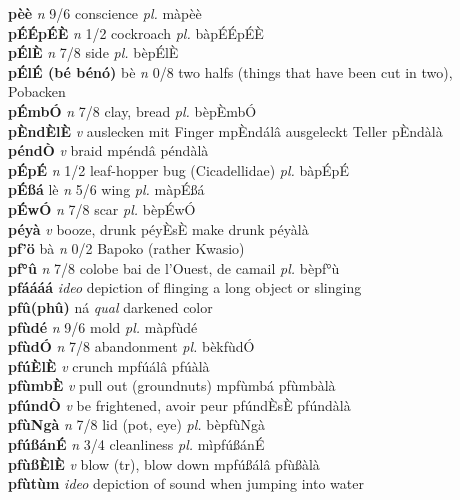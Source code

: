 \documentclass{article}
\begin{document}
{\bf pèè}  {\it n} 9/6 conscience {\it pl.} màpèè         \\ 
{\bf pÉÉpÉÈ}  {\it n} 1/2 cockroach {\it pl.} bàpÉÉpÉÈ         \\ 
{\bf pÉlÈ}  {\it n} 7/8 side {\it pl.} bèpÉlÈ         \\ 
{\bf pÉlÉ (bé bénó)} bè {\it n} 0/8 two halfs (things that have been cut in two), Pobacken         \\ 
{\bf pÉmbÓ}  {\it n} 7/8 clay, bread {\it pl.} bèpÈmbÓ         \\ 
{\bf pÈndÈlÈ}  {\it v} auslecken mit Finger   mpÈndálâ ausgeleckt Teller   pÈndàlà   \\ 
{\bf péndÒ}  {\it v} braid   mpéndâ   péndàlà   \\ 
{\bf pÉpÉ}  {\it n} 1/2 leaf-hopper bug (Cicadellidae) {\it pl.} bàpÉpÉ         \\ 
{\bf pÉßá} lè {\it n} 5/6 wing {\it pl.} màpÉßá         \\ 
{\bf pÉwÓ}  {\it n} 7/8 scar {\it pl.} bèpÉwÓ         \\ 
{\bf péyà}  {\it v} booze, drunk     péyÈsÈ make drunk péyàlà   \\ 
{\bf pf'ö} bà {\it n} 0/2 Bapoko (rather Kwasio)         \\ 
{\bf pf°û}  {\it n} 7/8 colobe bai de l'Ouest, de camail {\it pl.} bèpf°ù         \\ 
{\bf pfáááá}  {\it ideo} depiction of flinging a long object or slinging         \\ 
{\bf pfû(phû)} ná {\it qual} darkened color         \\ 
{\bf pfùdé}  {\it n} 9/6 mold {\it pl.} màpfùdé         \\ 
{\bf pfùdÓ}  {\it n} 7/8 abandonment {\it pl.} bèkfùdÓ         \\ 
{\bf pfúÈlÈ}  {\it v} crunch   mpfúálâ   pfúàlà   \\ 
{\bf pfùmbÈ}  {\it v} pull out (groundnuts)   mpfùmbá   pfùmbàlà   \\ 
{\bf pfúndÒ}  {\it v} be frightened, avoir peur     pfúndÈsÈ pfúndàlà   \\ 
{\bf pfùNgà}  {\it n} 7/8 lid (pot, eye) {\it pl.} bèpfùNgà         \\ 
{\bf pfúßánÉ}  {\it n} 3/4 cleanliness {\it pl.} mìpfúßánÉ         \\ 
{\bf pfùßÈlÈ}  {\it v} blow (tr), blow down   mpfúßálâ   pfùßàlà   \\ 
{\bf pfùtùm}  {\it ideo} depiction of sound when jumping into water         \\ 
\end{document}
